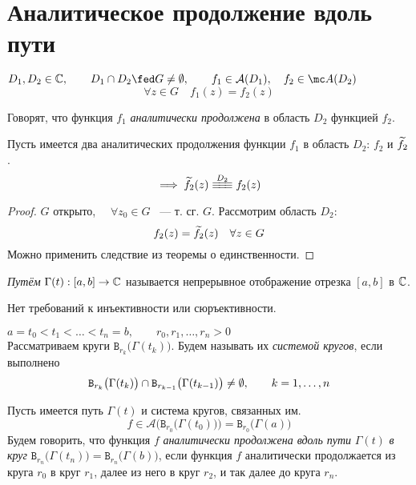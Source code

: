 \section{Аналитическое продолжение вдоль пути}

\begin{definition}
	$ D_1, D_2 \in \Co, \qquad D_1 \cap D_2 \fed G \ne \O, \qquad f_1 \in \mathcal A(D_1), \quad f_2 \in \mc A(D_2) $
	$$ \forall z \in G \quad f_1(z) = f_2(z) $$

	Говорят, что функция $ f_1 $ \emph{аналитически продолжена} в область $ D_2 $ функцией $ f_2 $.
\end{definition}

\begin{theorem}
	Пусть имеется два аналитических продолжения функции $ f_1 $ в область $ D_2 $: $ f_2 $ и $ \widetilde{f_2} $.
	$$ \implies \vawe{f_2}(z) \equiv[D_2] f_2(z) $$
\end{theorem}

\begin{proof}
	$ G $ открыто, $ \quad \forall z_0 \in G $ ~--- т. сг. $ G $. Рассмотрим область $ D_2 $:
	$$ f_2(z) = \widetilde{f_2}(z) \quad \forall z \in G $$
	Можно применить следствие из теоремы о единственности.
\end{proof}

\begin{definition}
	\emph{Путём} $ \Gamma(t) : [a, b] \to \mathbb{C} $ называется непрерывное отображение отрезка $ [a, b] $ в $ \mathbb{C} $.
\end{definition}

\begin{remark}
	Нет требований к инъективности или сюръективности.
\end{remark}

\begin{definition}
	$ a = t_0 < t_1 < \dots < t_n = b, \qquad r_0, r_1, \dots, r_n > 0 $ \\
	Рассматриваем круги $ \mathtt B_{r_k} \big( \Gamma(t_k) \big) $.
	Будем называть их \emph{системой кругов}, если выполнено
	$$ \mathtt B_{r_k} \big( \Gamma(t_k) \big) \cap \mathtt B_{r_{k - 1}} \big( \Gamma(t_{k - 1}) \big) \ne \emptyset, \qquad k = 1, \dots, n $$
\end{definition}

\begin{definition}
	Пусть имеется путь $ \Gamma(t) $ и система кругов, связанных им.
	$$ f \in \mathcal A \bigg( \mathtt B_{r_0} \big( \Gamma(t_0) \big) \bigg) = \mathtt B_{r_0} \big( \Gamma(a) \big) $$
	Будем говорить, что функция $ f $ \emph{аналитически продолжена вдоль пути} $ \Gamma(t) $ \emph{в круг} $ \mathtt B_{r_n} \big( \Gamma(t_n) \big) = \mathtt B_{r_n} \big( \Gamma(b) \big) $, если функция $ f $ аналитически продолжается из круга $ r_0 $ в круг $ r_1 $, далее из него в круг $ r_2 $, и так далее до круга $ r_n $.
\end{definition}

